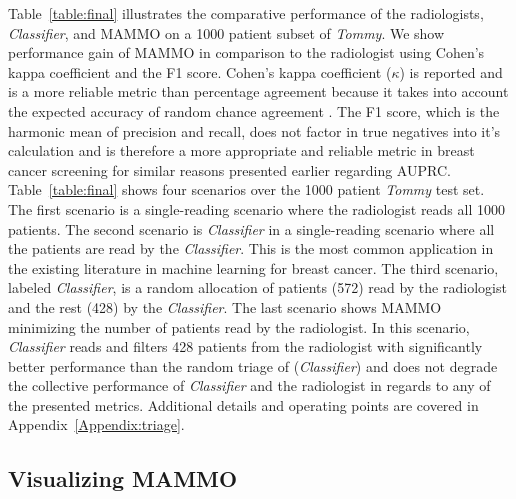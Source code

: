 \documentclass[journal]{IEEEtran}
\begin{document}
Table~\ref{table:final} illustrates the comparative performance of the radiologists, \textit{Classifier}, and MAMMO on a 1000 patient subset of \textit{Tommy}.  We show performance gain of MAMMO in comparison to the radiologist using Cohen's kappa coefficient and the F1 score.
Cohen's kappa coefficient ($\kappa$) is reported and is a more reliable metric than percentage agreement because it takes into account the expected accuracy of random chance agreement \cite{cohen-kappa}.  
The F1 score, which is the harmonic mean of precision and recall, does not factor in true negatives into it's calculation and is therefore a more appropriate and reliable metric in breast cancer screening for similar reasons presented earlier regarding AUPRC.  
Table~\ref{table:final} shows four scenarios over the 1000 patient \textit{Tommy} test set.
The first scenario is a single-reading scenario where the radiologist reads all 1000 patients.  The second scenario is \textit{Classifier} in a single-reading scenario where all the patients are read by the \textit{Classifier}.  This is the most common application in the existing literature in machine learning for breast cancer. The third scenario, labeled  \textit{Classifier\textsuperscript{\textregistered}}, is a random allocation of patients (572) read by the radiologist and the rest (428) by the \textit{Classifier}. The last scenario shows MAMMO minimizing the number of patients read by the radiologist. In this scenario, \textit{Classifier} reads and filters 428 patients from the radiologist with significantly better performance than the random triage of  (\textit{Classifier\textsuperscript{\textregistered}}) and does not degrade the collective performance of \textit{Classifier} and the radiologist in regards to any of the presented metrics. Additional details and operating points are covered in Appendix~\ref{Appendix:triage}. 




\subsection{Visualizing MAMMO}
\end{document}
